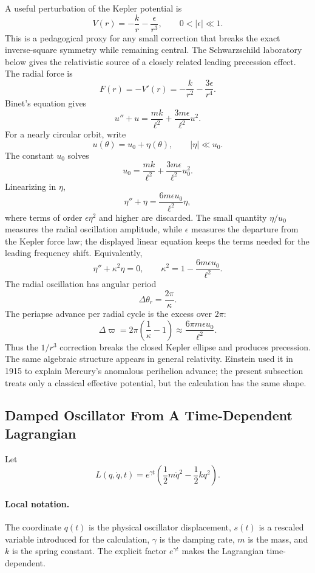 A useful perturbation of the Kepler potential is
\[
  V(r)=-\frac{k}{r}-\frac{\epsilon}{r^3},
  \qquad
  0<|\epsilon|\ll1.
\]
This is a pedagogical proxy for any small correction that breaks the exact
inverse-square symmetry while remaining central. The Schwarzschild laboratory
below gives the relativistic source of a closely related leading precession
effect.
The radial force is
\[
  F(r)=-V'(r)=-\frac{k}{r^2}-\frac{3\epsilon}{r^4}.
\]
Binet's equation gives
\[
  u''+u
  =
  \frac{mk}{\ell^2}
  +
  \frac{3m\epsilon}{\ell^2}u^2.
\]
For a nearly circular orbit, write
\[
  u(\theta)=u_0+\eta(\theta),
  \qquad
  |\eta|\ll u_0.
\]
The constant \(u_0\) solves
\[
  u_0=\frac{mk}{\ell^2}+\frac{3m\epsilon}{\ell^2}u_0^2.
\]
Linearizing in \(\eta\),
\[
  \eta''+\eta
  =
  \frac{6m\epsilon u_0}{\ell^2}\eta,
\]
where terms of order \(\epsilon\eta^2\) and higher are discarded. The small
quantity \(\eta/u_0\) measures the radial oscillation amplitude, while
\(\epsilon\) measures the departure from the Kepler force law; the displayed
linear equation keeps the terms needed for the leading frequency shift.
Equivalently,
\[
  \eta''+\kappa^2\eta=0,
  \qquad
  \kappa^2=1-\frac{6m\epsilon u_0}{\ell^2}.
\]
The radial oscillation has angular period
\[
  \Delta\theta_r=\frac{2\pi}{\kappa}.
\]
The periapse advance per radial cycle is the excess over \(2\pi\):
\[
  \Delta\varpi
  =
  2\pi\left(\frac1\kappa-1\right)
  \approx
  \frac{6\pi m\epsilon u_0}{\ell^2}.
\]
Thus the \(1/r^3\) correction breaks the closed Kepler ellipse and produces
precession. The same algebraic structure appears in general relativity.
Einstein used it in 1915 to explain Mercury's anomalous perihelion advance; the
present subsection treats only a classical effective potential, but the
calculation has the same shape.

\subsection{Damped Oscillator From A Time-Dependent Lagrangian}
\label{sec:lab-damped-oscillator}

Let
\[
  L(q,\dot q,t)
  =
  e^{\gamma t}
  \left(
    \frac12m\dot q^2-\frac12kq^2
  \right).
\]

\paragraph{Local notation.}
The coordinate \(q(t)\) is the physical oscillator displacement, \(s(t)\) is a
rescaled variable introduced for the calculation, \(\gamma\) is the damping
rate, \(m\) is the mass, and \(k\) is the spring constant.  The explicit factor
\(e^{\gamma t}\) makes the Lagrangian time-dependent.

